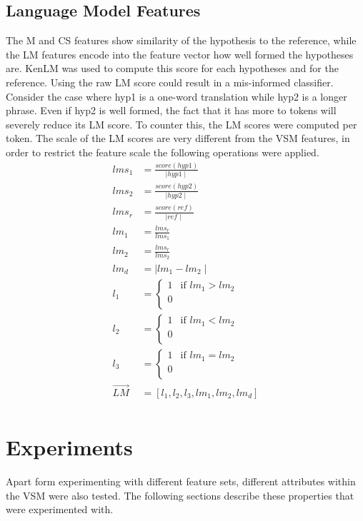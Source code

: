 \documentclass[11pt]{article}
\begin{document}
\subsection{Language Model Features}
The M and CS features show similarity of the hypothesis to the reference, while
the LM features encode into the feature vector how well formed the hypotheses
are. KenLM was used to compute this score for each hypotheses and for the
reference. Using the raw LM score could result in a mis-informed classifier.
Consider the case where hyp1 is a one-word translation while hyp2 is a longer
phrase. Even if hyp2 is well formed, the fact that it has more to tokens will
severely reduce its LM score. To counter this, the LM scores were computed per
token. The scale of the LM scores are very different from the VSM features, in
order to restrict the feature scale the following operations were applied.
\begin{align*}
lms_1 &= \frac{score(hyp1)} {\mid hyp1 \mid}\\
lms_2 &= \frac{score(hyp2)} {\mid hyp2 \mid}\\
lms_r &= \frac{score(ref)} {\mid ref \mid}\\
lm_1 &= \frac{lms_r}{lms_1}\\
lm_2 &= \frac{lms_r}{lms_2}\\
lm_d &= \mid lm_1 - lm_2 \mid\\
l_1 &= \begin{cases} 1 &\mbox{if } lm_1 > lm_2\\
0\\
\end{cases}\\
l_2 &= \begin{cases} 1 &\mbox{if } lm_1 < lm_2\\
0\\
\end{cases}\\
l_3 &= \begin{cases} 1 &\mbox{if } lm_1 = lm_2\\
0\\
\end{cases}\\
\vec{LM} &= [l_1, l_2, l_3, lm_1, lm_2, lm_d]\\
\end{align*}
\section{Experiments}
Apart form experimenting with different feature sets, different attributes
within the VSM were also tested. The following sections describe these
properties that were experimented with.
\end{document}
